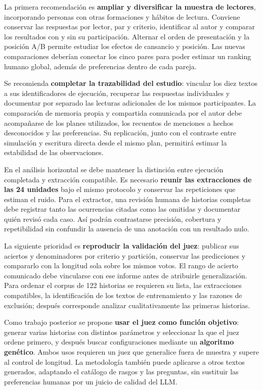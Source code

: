 \begin{recomendations}

La primera recomendación es \textbf{ampliar y diversificar la muestra de lectores}, incorporando
personas con otras formaciones y hábitos de lectura. Conviene conservar las respuestas por lector,
par y criterio, identificar al autor y comparar los resultados con y sin su participación. Alternar
el orden de presentación y la posición A/B permite estudiar los efectos de cansancio y posición.
Las nuevas comparaciones deberían conectar los cinco pares para poder estimar un ranking humano
global, además de preferencias dentro de cada pareja.

Se recomienda \textbf{completar la trazabilidad del estudio}: vincular los diez textos a sus
identificadores de ejecución, recuperar las respuestas individuales y documentar por separado las
lecturas adicionales de los mismos participantes. La comparación de memoria propia y compartida
comunicada por el autor debe acompañarse de los planes utilizados, los recuentos de menciones a
hechos desconocidos y las preferencias. Su replicación, junto con el contraste entre simulación y
escritura directa desde el mismo plan, permitirá estimar la estabilidad de las observaciones.

En el análisis horizontal se debe mantener la distinción entre ejecución completada y extracción
compatible. Es necesario \textbf{reunir las extracciones de las 24 unidades} bajo el mismo protocolo
y conservar las repeticiones que estiman el ruido. Para el extractor, una revisión humana de
historias completas debe registrar tanto las ocurrencias citadas como las omitidas y documentar
quién revisó cada caso. Así podrán contrastarse precisión, cobertura y repetibilidad sin confundir
la ausencia de una anotación con un resultado nulo.

La siguiente prioridad es \textbf{reproducir la validación del juez}: publicar sus aciertos y
denominadores por criterio y partición, conservar las predicciones y compararlo con la longitud
sola sobre los mismos votos. El rango de acierto comunicado debe vincularse con ese informe antes
de atribuirle generalización. Para ordenar el corpus de 122 historias se requieren su lista,
las extracciones compatibles, la identificación de los textos de entrenamiento y las razones de
exclusión; después corresponde analizar cualitativamente las primeras historias.

Como trabajo posterior se propone \textbf{usar el juez como función objetivo}: generar varias
historias con distintos parámetros y seleccionar la que el juez ordene primero, y después buscar
configuraciones mediante un \textbf{algoritmo genético}. Ambos usos requieren un juez que generalice
fuera de muestra y supere al control de longitud. La metodología también puede aplicarse a otros
textos generados, adaptando el catálogo de rasgos y las preguntas, sin sustituir las preferencias
humanas por un juicio de calidad del LLM.

\end{recomendations}
